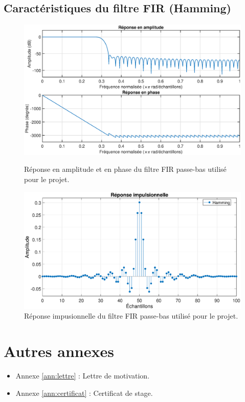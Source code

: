 \documentclass[oneside]{book}
\begin{document}
\begin{appendices}
\section{Caractéristiques du filtre FIR (Hamming)}
\label{ann:hamming}
\begin{figure}[htbp]
    \centering
    \includegraphics[scale=0.48]{image/hamming}
    \caption{Réponse en amplitude et en phase du filtre FIR passe-bas utilisé pour le projet.}
    \label{fig:hamming}
    \vspace{0.4cm}
     \centering
    \includegraphics[scale=0.48]{image/impulse_response}
    \caption{Réponse impusionnelle du filtre FIR passe-bas utilisé pour le projet.}
    \label{fig:impulse_response}
\end{figure}










\newpage

\chapter{Autres annexes}
\begin{itemize}
\item Annexe \ref{ann:lettre} : Lettre de motivation.
\item Annexe \ref{ann:certificat} : Certificat de stage.
\end{itemize}


\end{appendices}
\end{document}
